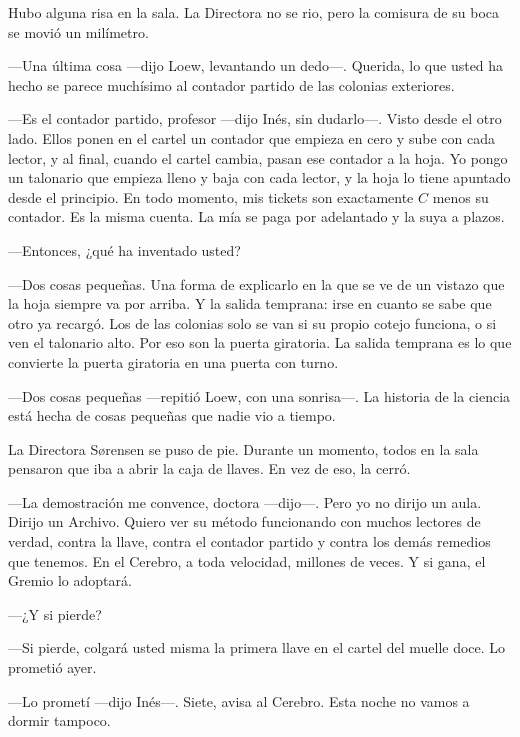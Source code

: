 Hubo alguna risa en la sala. La Directora no se rio, pero la comisura de su boca se movió un milímetro.

\escena
---Una última cosa ---dijo Loew, levantando un dedo---\nobreak. Querida, lo que usted ha hecho se parece muchísimo al contador partido de las colonias exteriores.

---Es el contador partido, profesor ---dijo Inés, sin dudarlo---\nobreak. Visto desde el otro lado. Ellos ponen en el cartel un contador que empieza en cero y sube con cada lector, y al final, cuando el cartel cambia, pasan ese contador a la hoja. Yo pongo un talonario que empieza lleno y baja con cada lector, y la hoja lo tiene apuntado desde el principio. En todo momento, mis tickets son exactamente $C$ menos su contador. Es la misma cuenta. La mía se paga por adelantado y la suya a plazos.

---Entonces, ¿qué ha inventado usted?

---Dos cosas pequeñas. Una forma de explicarlo en la que se ve de un vistazo que la hoja siempre va por arriba. Y la salida temprana: irse en cuanto se sabe que otro ya recargó. Los de las colonias solo se van si su propio cotejo funciona, o si ven el talonario alto. Por eso son la puerta giratoria. La salida temprana es lo que convierte la puerta giratoria en una puerta con turno.

---Dos cosas pequeñas ---repitió Loew, con una sonrisa---\nobreak. La historia de la ciencia está hecha de cosas pequeñas que nadie vio a tiempo.

La Directora Sørensen se puso de pie. Durante un momento, todos en la sala pensaron que iba a abrir la caja de llaves. En vez de eso, la cerró.

---La demostración me convence, doctora ---dijo---\nobreak. Pero yo no dirijo un aula. Dirijo un Archivo. Quiero ver su método funcionando con muchos lectores de verdad, contra la llave, contra el contador partido y contra los demás remedios que tenemos. En el Cerebro, a toda velocidad, millones de veces. Y si gana, el Gremio lo adoptará.

---¿Y si pierde?

---Si pierde, colgará usted misma la primera llave en el cartel del muelle doce. Lo prometió ayer.

---Lo prometí ---dijo Inés---\nobreak. Siete, avisa al Cerebro. Esta noche no vamos a dormir tampoco.
